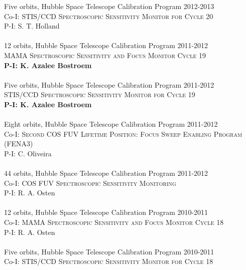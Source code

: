 \documentclass[10pt]{cv}
\begin{document}
\begin{llist}
Five orbits, Hubble Space Telescope Calibration Program \hfill  2012-2013\\ %
Co-I: \textsc{STIS/CCD Spectroscopic Sensitivity Monitor for Cycle 20} \\
P-I: S. T. Holland\\ %
\\
12 orbits, Hubble Space Telescope Calibration Program \hfill 2011-2012\\ %
\textsc{MAMA Spectroscopic Sensitivity and Focus Monitor Cycle 19}\\
{\bf P-I: K. Azalee Bostroem} \\ %
\\
Five orbits, Hubble Space Telescope Calibration Program \hfill 2011-2012\\ %
\textsc{STIS/CCD Spectroscopic Sensitivity Monitor for Cycle 19}\\
{\bf P-I: K. Azalee Bostroem} \\ %
\\
Eight orbits, Hubble Space Telescope Calibration Program \hfill 2011-2012\\ %
Co-I: \textsc{Second COS FUV Lifetime Position: Focus Sweep Enabling Program (FENA3)} \\
P-I: C. Oliveira \\%
\\
44 orbits, Hubble Space Telescope Calibration Program \hfill 2011-2012\\ %
Co-I: \textsc{COS FUV Spectroscopic Sensitivity Monitoring} \\
P-I: R. A. Osten\\%
\\
12 orbits, Hubble Space Telescope Calibration Program \hfill 2010-2011\\ %
Co-I: \textsc{MAMA Spectroscopic Sensitivity and Focus Monitor Cycle 18} \\
P-I: R. A. Osten \\%
\\
Five orbits, Hubble Space Telescope Calibration Program \hfill 2010-2011\\ %
Co-I: \textsc{STIS/CCD Spectroscopic Sensitivity Monitor for Cycle 18} \\

\end{llist}
\end{document}

